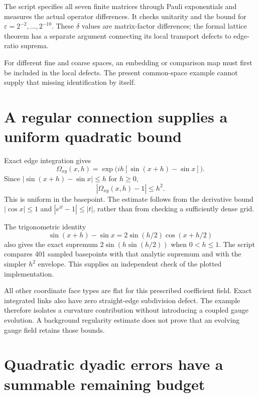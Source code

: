 The script specifies all seven finite matrices through Pauli exponentials and measures the actual operator differences. It checks unitarity and the bound for $\varepsilon=2^{-2},\ldots,2^{-10}$. These $\delta$ values are matrix-factor differences; the formal lattice theorem has a separate argument connecting its local transport defects to edge-ratio suprema.

For different fine and coarse spaces, an embedding or comparison map must first be included in the local defects. The present common-space example cannot supply that missing identification by itself.



\clearpage
\section{A regular connection supplies a uniform quadratic bound}

Exact edge integration gives
\[
\Omega_{xy}(x,h)=\exp\!\bigl(ih[\sin(x+h)-\sin x]\bigr).
\]
Since $|\sin(x+h)-\sin x|\leq h$ for $h\geq0$,
\[
|\Omega_{xy}(x,h)-1|\leq h^2.
\]
This is uniform in the basepoint. The estimate follows from the derivative bound $|\cos x|\leq1$ and $|e^{it}-1|\leq|t|$, rather than from checking a sufficiently dense grid.

The trigonometric identity
\[
\sin(x+h)-\sin x=2\sin(h/2)\cos(x+h/2)
\]
also gives the exact supremum $2\sin(h\sin(h/2))$ when $0<h\leq1$. The script compares 401 sampled basepoints with that analytic supremum and with the simpler $h^2$ envelope. This supplies an independent check of the plotted implementation.

All other coordinate face types are flat for this prescribed coefficient field. Exact integrated links also have zero straight-edge subdivision defect. The example therefore isolates a curvature contribution without introducing a coupled gauge evolution. A background regularity estimate does not prove that an evolving gauge field retains those bounds.



\clearpage
\section{Quadratic dyadic errors have a summable remaining budget}

